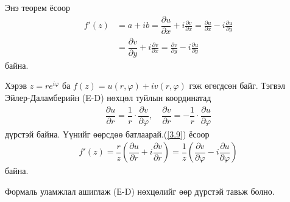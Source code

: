 Энэ теорем ёсоор 
\begin{equation}
 \begin{split}
f'(z)&=a+ib=\dfrac{\partial u}{\partial x}+i\frac{\partial v}{\partial x}=\frac{\partial u}{\partial x}-i\frac{\partial u}{\partial y} \\
&=\dfrac{\partial v}{\partial y}+i\frac{\partial v}{\partial x}=\frac{\partial v}{\partial y}-i\frac{\partial u}{\partial y}
 \end{split}  
\end{equation}
байна. 

Хэрэв $z=re^{i\varphi}$ ба $f(z)=u(r,\varphi)+iv(r,\varphi)$ гэж өгөгдсөн байг. Тэгвэл Эйлер-Даламберийн (E-D) нөхцөл туйлын координатад
\begin{eqnarray} \label{3.9}
 \dfrac{\partial u}{\partial r}=\dfrac{1}{r}\cdot \dfrac{\partial v}{\partial \varphi}, \quad
 \dfrac{\partial v}{\partial r}=-\dfrac{1}{r}\cdot \dfrac{\partial u}{\partial \varphi}
\end{eqnarray}
дүрстэй байна. Үүнийг өөрсдөө батлаарай.(\ref{3.9}) ёсоор
\begin{eqnarray}
 f'(z)=\dfrac{r}{z}\left(\dfrac{\partial u}{\partial r}+i\dfrac{\partial v}{\partial r}\right)=\dfrac{1}{z}\left(\dfrac{\partial v}{\partial \varphi}-i\dfrac{\partial u}{\partial \varphi}\right)
 \end{eqnarray}
байна.

Формаль уламжлал ашиглаж (Е-D) нөхцөлийг өөр дүрстэй тавьж болно. 

